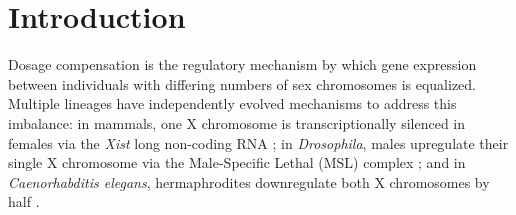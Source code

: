 \documentclass[12pt]{article}
\newcommand{\citep}{\parencite}
\begin{document}

\section*{Introduction}
Dosage compensation is the regulatory mechanism by which gene expression between
individuals with differing numbers of sex chromosomes is equalized.
Multiple lineages have independently evolved mechanisms to address this imbalance:
in mammals, one X chromosome is transcriptionally silenced in females via the \textit{Xist} long non-coding RNA \citep{lyon1961gene, brockdorff2015dosage};
in \textit{Drosophila}, males upregulate their single X chromosome via the Male-Specific Lethal (MSL) complex \citep{lucchesi2015dosage, conrad2012dosage};
and in \textit{Caenorhabditis elegans}, hermaphrodites downregulate both X chromosomes by half \citep{meyer2005x}.
\end{document}
